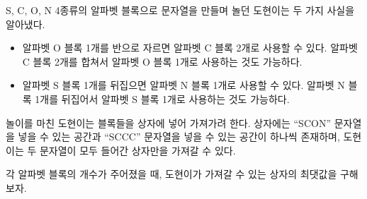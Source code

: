 S, C, O, N 4종류의 알파벳 블록으로 문자열을 만들며 놀던 도현이는 두 가지 사실을 알아냈다.

\begin{itemize}
    \item 알파벳 O 블록 1개를 반으로 자르면 알파벳 C 블록 2개로 사용할 수 있다. 알파벳 C 블록 2개를 합쳐서 알파벳 O 블록 1개로 사용하는 것도 가능하다.
    \item 알파벳 S 블록 1개를 뒤집으면 알파벳 N 블록 1개로 사용할 수 있다. 알파벳 N 블록 1개를 뒤집어서 알파벳 S 블록 1개로 사용하는 것도 가능하다.
\end{itemize}

놀이를 마친 도현이는 블록들을 상자에 넣어 가져가려 한다. 상자에는 ``SCON'' 문자열을 넣을 수 있는 공간과 ``SCCC'' 문자열을 넣을 수 있는 공간이 하나씩 존재하며, 도현이는 두 문자열이 모두 들어간 상자만을 가져갈 수 있다.

각 알파벳 블록의 개수가 주어졌을 때, 도현이가 가져갈 수 있는 상자의 최댓값을 구해보자.
